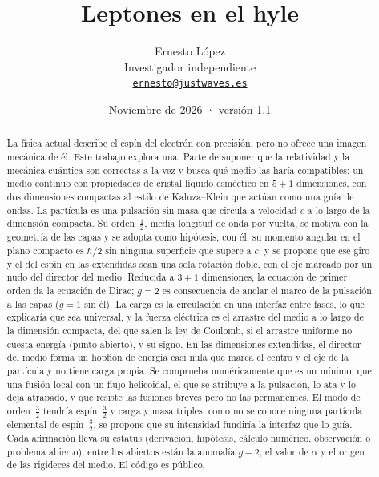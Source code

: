 \documentclass[11pt,a4paper]{article}
\title{\textbf{Leptones en el hyle}}
\author{Ernesto López\\[0.2em]\small Investigador independiente\\
\small\href{mailto:ernesto@justwaves.es}{\texttt{ernesto@justwaves.es}}}
\date{Noviembre de 2026 · versión 1.1}
\begin{document}
\maketitle
\begin{abstract}
\noindent La física actual describe el espín del electrón con precisión, pero no ofrece una imagen mecánica de él. Este trabajo explora una. Parte de suponer que la relatividad y la mecánica cuántica son correctas a la vez y busca qué medio las haría compatibles: un medio continuo con propiedades de cristal líquido esméctico en $5+1$ dimensiones, con dos dimensiones compactas al estilo de Kaluza--Klein que actúan como una guía de ondas. La partícula es una pulsación sin masa que circula a velocidad $c$ a lo largo de la dimensión compacta. Su orden~$\tfrac12$, media longitud de onda por vuelta, se motiva con la geometría de las capas y se adopta como hipótesis; con él, su momento angular en el plano compacto es $\hbar/2$ sin ninguna superficie que supere a $c$, y se propone que ese giro y el del espín en las extendidas sean una sola rotación doble, con el eje marcado por un nudo del director del medio. Reducida a $3+1$ dimensiones, la ecuación de primer orden da la ecuación de Dirac; $g=2$ es consecuencia de anclar el marco de la pulsación a las capas ($g=1$ sin él). La carga es la circulación en una interfaz entre fases, lo que explicaría que sea universal, y la fuerza eléctrica es el arrastre del medio a lo largo de la dimensión compacta, del que salen la ley de Coulomb, si el arrastre uniforme no cuesta energía (punto abierto), y su signo. En las dimensiones extendidas, el director del medio forma un hopfión de energía casi nula que marca el centro y el eje de la partícula y no tiene carga propia. Se comprueba numéricamente que es un mínimo, que una fusión local con un flujo helicoidal, el que se atribuye a la pulsación, lo ata y lo deja atrapado, y que resiste las fusiones breves pero no las permanentes. El modo de orden~$\tfrac32$ tendría espín~$\tfrac32$ y carga y masa triples; como no se conoce ninguna partícula elemental de espín~$\tfrac32$, se propone que su intensidad fundiría la interfaz que lo guía. Cada afirmación lleva su estatus (derivación, hipótesis, cálculo numérico, observación o problema abierto); entre los abiertos están la anomalía $g-2$, el valor de $\alpha$ y el origen de las rigideces del medio. El código es público.
\end{abstract}
\end{document}
